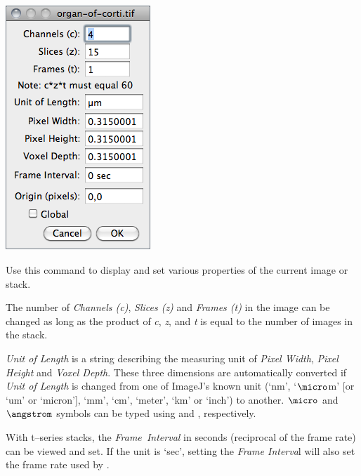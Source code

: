 \subsection{\protect{}\label{sub:Image>Properties...}}

\begin{minipage}[c][1\totalheight][t]{0.306\columnwidth}%
\includegraphics[scale=0.55]{images/ImageProperties}%
\end{minipage}%
\begin{minipage}[c][1\totalheight][t]{0.694\columnwidth}%
Use this command to display and set various properties of the current
image or stack. \medskip{}


The number of \emph{Channels (c)}, \emph{Slices (z) }and \emph{Frames
(t)} in the image can be changed as long as the product of \emph{c},
\emph{z}, and \emph{t} is equal to the number of images in the stack.\medskip{}


\emph{Unit of Length }is a string describing the measuring unit
of \emph{Pixel Width}, \emph{Pixel Height} and
\emph{Voxel Depth}. These three dimensions are
automatically converted if \emph{Unit of Length} is changed from one
of ImageJ's known unit (`nm', `$\micro$m' {[}or `um' or `micron'{]},
`mm', `cm', `meter', `km' or `inch') to another. $\micro$
and $\angstrom$ symbols can be typed using 
and , respectively.

\medskip{}


With t--series stacks, the \emph{Frame~Interval
}in seconds (reciprocal of the frame rate) can be viewed and set.
If the unit is `sec', setting the \emph{Frame Interva}l will also
set the frame rate used by .%
\end{minipage}

